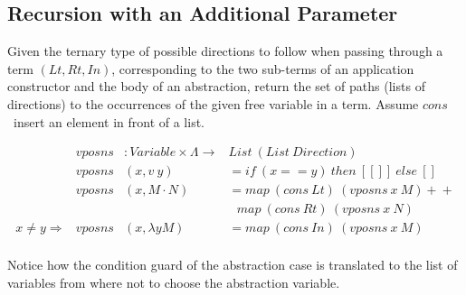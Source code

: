 \documentclass{entcs}
\begin{document}

\subsection{Recursion with an Additional Parameter}

Given the ternary type of possible directions to follow when passing through a term $({Lt, Rt, In})$, corresponding to the two sub-terms of an application constructor and the body of an abstraction, return the set of paths (lists of directions) to the occurrences of the given free variable in a term. Assume $cons$\ insert an element in front of a list.

\[
\begin{array}{rrll}
&vposns &: Variable \times \Lambda \rightarrow & List\ (List\ Direction) \\
&vposns &(x , v\ y)         &= if\ (x == y)\ then\ [[]]\ else\ []   \\
&vposns &(x , M \cdot N)    &= map\ (cons\ Lt)\ (vposns\ x\ M) +\!\!+  \\
& & &\ \ \ map\ (cons\ Rt)\ (vposns\ x\ N) \\
x \neq y \Rightarrow&vposns &(x ,\lambda y M)   &= map\ (cons\ In)\ (vposns\ x\ M) \\
\end{array} \]

Notice how the condition guard of the abstraction case is translated to the list of variables from where not to choose the abstraction variable.

\end{document}
